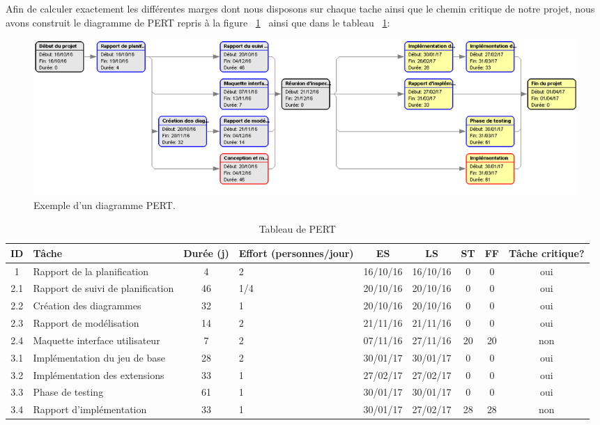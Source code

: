 \documentclass[]{article}
\newcommand{\placeholder}[1]{{\noindent \color{red}[ #1 ]}}
\begin{document}
Afin de calculer exactement les différentes marges dont nous disposons sur chaque tache ainsi que le chemin critique de notre projet, nous avons construit le diagramme de PERT repris à la figure ~\ref{fig:PERT} \, ainsi que dans le tableau ~\ref{tab:PERT}:

\begin{figure}[!htb]
\begin{center}
  \includegraphics[width=\textwidth]{planif-pert.png}
  \caption{Exemple d'un diagramme PERT.}\label{fig:PERT}
\end{center}
\end{figure}
\FloatBarrier



\begin{table}[htbp]
\begin{center}
\begin{tabular}{|c|p{4cm}||c|p{2cm}|c|c|c|c|c|}
\hline
\textbf{ID} & T\^ache & Durée (j) & Effort (personnes/jour) & ES & LS & ST & FF & T\^ache critique?\\
\hline\hline
1 & Rapport de la planification & 4 & 2 & 16/10/16 & 16/10/16 & 0 & 0 & oui\\
\hline
\hline
2.1 & Rapport de suivi de planification & 46 & 1/4 & 20/10/16 & 20/10/16 & 0 & 0 & oui\\
\hline
2.2 & Création des diagrammes & 32 & 1 & 20/10/16 & 20/10/16 & 0 & 0 & oui\\
\hline
2.3 & Rapport de modélisation & 14 & 2 & 21/11/16 & 21/11/16 & 0 & 0 & oui\\
\hline
2.4 & Maquette interface utilisateur & 7 & 2 & 07/11/16 & 27/11/16 & 20 & 20 & non\\
\hline
\hline
3.1 & Implémentation du jeu de base & 28 & 2 & 30/01/17 & 30/01/17 & 0 & 0 & oui\\
\hline
3.2 & Implémentation des extensions & 33 & 1 & 27/02/17 & 27/02/17 & 0 & 0 & oui\\
\hline
3.3 & Phase de testing & 61 & 1 & 30/01/17 & 30/01/17 & 0 & 0 & oui\\
\hline
3.4 & Rapport d'implémentation & 33 & 1 & 30/01/17 & 27/02/17 & 28 & 28 & non\\
\hline
\end{tabular}
\end{center}
   \caption{Tableau de PERT}
   \label{tab:PERT}
\end{table}
\end{document}
